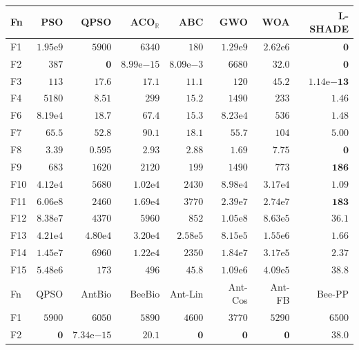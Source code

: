 \begin{tabular}{lrrrrrrr}
\toprule
Fn & PSO & QPSO & ACO$_\mathbb{R}$ & ABC & GWO & WOA & L-SHADE \\
\midrule
F1 & $1.95\mathrm{e}{9}$ & $5900$ & $6340$ & $180$ & $1.29\mathrm{e}{9}$ & $2.62\mathrm{e}{6}$ & $\mathbf{0}$ \\
F2 & $387$ & $\mathbf{0}$ & $8.99\mathrm{e}{-15}$ & $8.09\mathrm{e}{-3}$ & $6680$ & $32.0$ & $\mathbf{0}$ \\
F3 & $113$ & $17.6$ & $17.1$ & $11.1$ & $120$ & $45.2$ & $\mathbf{1.14\mathrm{e}{-13}}$ \\
F4 & $5180$ & $8.51$ & $299$ & $15.2$ & $1490$ & $233$ & $\mathbf{1.46}$ \\
F6 & $8.19\mathrm{e}{4}$ & $18.7$ & $67.4$ & $15.3$ & $8.23\mathrm{e}{4}$ & $536$ & $\mathbf{1.48}$ \\
F7 & $65.5$ & $52.8$ & $90.1$ & $18.1$ & $55.7$ & $104$ & $\mathbf{5.00}$ \\
F8 & $3.39$ & $0.595$ & $2.93$ & $2.88$ & $1.69$ & $7.75$ & $\mathbf{0}$ \\
F9 & $683$ & $1620$ & $2120$ & $199$ & $1490$ & $773$ & $\mathbf{186}$ \\
F10 & $4.12\mathrm{e}{4}$ & $5680$ & $1.02\mathrm{e}{4}$ & $2430$ & $8.98\mathrm{e}{4}$ & $3.17\mathrm{e}{4}$ & $\mathbf{1.09}$ \\
F11 & $6.06\mathrm{e}{8}$ & $2460$ & $1.69\mathrm{e}{4}$ & $3770$ & $2.39\mathrm{e}{7}$ & $2.74\mathrm{e}{7}$ & $\mathbf{183}$ \\
F12 & $8.38\mathrm{e}{7}$ & $4370$ & $5960$ & $852$ & $1.05\mathrm{e}{8}$ & $8.63\mathrm{e}{5}$ & $\mathbf{36.1}$ \\
F13 & $4.21\mathrm{e}{4}$ & $4.80\mathrm{e}{4}$ & $3.20\mathrm{e}{4}$ & $2.58\mathrm{e}{5}$ & $8.15\mathrm{e}{5}$ & $1.55\mathrm{e}{6}$ & $\mathbf{1.66}$ \\
F14 & $1.45\mathrm{e}{7}$ & $6960$ & $1.22\mathrm{e}{4}$ & $2350$ & $1.84\mathrm{e}{7}$ & $3.17\mathrm{e}{5}$ & $\mathbf{2.37}$ \\
F15 & $5.48\mathrm{e}{6}$ & $173$ & $496$ & $45.8$ & $1.09\mathrm{e}{6}$ & $4.09\mathrm{e}{5}$ & $\mathbf{38.8}$ \\
\midrule
Fn & QPSO & AntBio & BeeBio & Ant-Lin & Ant-Cos & Ant-FB & Bee-PP \\
\midrule
F1 & $5900$ & $6050$ & $5890$ & $4600$ & $3770$ & $5290$ & $6500$ \\
F2 & $\mathbf{0}$ & $7.34\mathrm{e}{-15}$ & $20.1$ & $\mathbf{0}$ & $\mathbf{0}$ & $\mathbf{0}$ & $38.0$ \\

\end{tabular}
